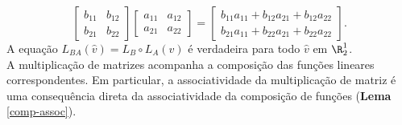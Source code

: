         $$\begin{bmatrix}
            b_{11} & b_{12} \\
            b_{21} & b_{22}
         \end{bmatrix}
         \begin{bmatrix}
            a_{11} & a_{12} \\
            a_{21} & a_{22}
         \end{bmatrix} = 
         \begin{bmatrix}
            b_{11}a_{11} + b_{12}a_{21} + b_{12}a_{22} \\
            b_{21}a_{11} + b_{22}a_{21} + b_{22}a_{22}
         \end{bmatrix}.$$
         A equação $L_{BA} (\hat{v}) = L_{B} \circ L_{A} (\hat{v})$ é verdadeira para todo $\hat{v}$ em $\R_{2}^{1}$.\\
         A multiplicação de matrizes acompanha a composição das funções lineares correspondentes. Em particular, a associatividade da multiplicação de matriz é uma consequência direta da associatividade da composição de funções (\textbf{Lema} \ref{comp-assoc}).

